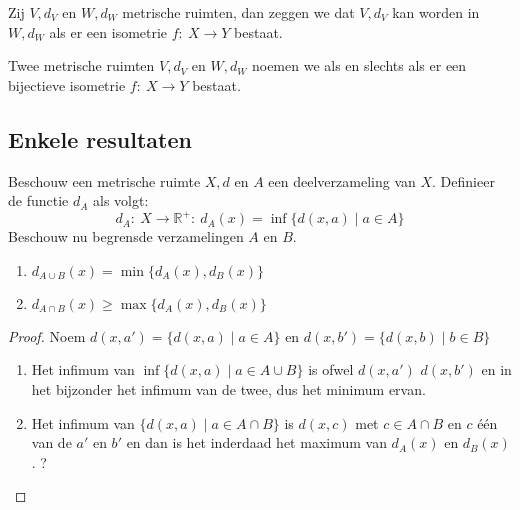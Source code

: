 \documentclass[main.tex]{subfiles}
\begin{document}
\begin{de}
  Zij $V,d_{V}$ en $W,d_{W}$ metrische ruimten, dan zeggen we dat $V,d_{V}$  kan worden in $W,d_{W}$ als er een isometrie $f:\ X \rightarrow Y$ bestaat.
\end{de}

\begin{de}
  Twee metrische ruimten $V,d_{V}$ en $W,d_{W}$ noemen we  als en slechts als er een bijectieve isometrie $f:\ X \rightarrow Y$ bestaat.
\end{de}




\subsection{Enkele resultaten}
\label{sec:enkele-resultaten}

\begin{st}
  Beschouw een metrische ruimte $X,d$ en $A$ een deelverzameling van $X$.
  Definieer de functie $d_{A}$ als volgt:
  \[ d_{A}:\ X \rightarrow \mathbb{R}^{+}:\ d_{A}(x) = \inf\{d(x,a) \mid a\in A\} \]
  Beschouw nu begrensde verzamelingen $A$ en $B$.
  \begin{enumerate}
  \item $d_{A\cup B}(x) = \min\{d_{A}(x),d_{B}(x)\}$
  \item $d_{A\cap B}(x) \ge \max\{d_{A}(x),d_{B}(x)\}$
  \end{enumerate}

  \begin{proof}
    \noindent
    Noem $d(x,a') = \{d(x,a) \mid a\in A\}$ en $d(x,b') = \{d(x,b) \mid b\in B\}$
    \begin{enumerate}
    \item Het infimum van $\inf\{d(x,a) \mid a\in A\cup B\}$ is ofwel $d(x,a')$ $d(x,b')$ en in het bijzonder het infimum van de twee, dus het minimum ervan.
    \item Het infimum van $\{d(x,a) \mid a\in A\cap B\}$ is $d(x,c)$ met $c\in A\cap B$ en $c$ \'e\'en van de $a'$ en $b'$ en dan is het inderdaad het maximum van $d_{A}(x)$ en $d_{B}(x)$.
      ?
    \end{enumerate}
  \end{proof}
\end{st}
\end{document}
